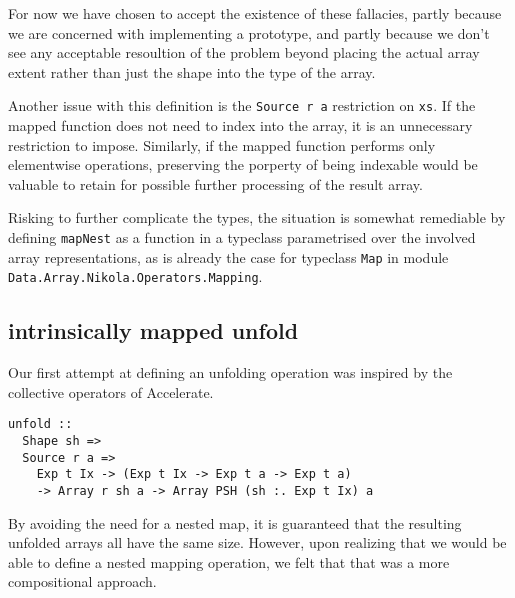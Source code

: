 For now we have chosen to accept the existence of these fallacies, partly
because we are concerned with implementing a prototype, and partly because we
don't see any acceptable resoultion of the problem beyond placing the actual
array extent rather than just the shape into the type of the array.

Another issue with this definition is the \texttt{Source r a} restriction on
\texttt{xs}. If the mapped function does not need to index into the array, it
is an unnecessary restriction to impose.  Similarly, if the mapped function
performs only elementwise operations, preserving the porperty of being
indexable would be valuable to retain for possible further processing of the
result array.

Risking to further complicate the types, the situation is somewhat remediable
by defining \texttt{mapNest} as a function in a typeclass parametrised over the
involved array representations, as is already the case for typeclass
\texttt{Map} in module \texttt{Data.Array.Nikola.Operators.Mapping}.

\subsection{intrinsically mapped unfold}

Our first attempt at defining an unfolding operation was inspired by the
collective operators of Accelerate.

\begin{verbatim}
unfold ::
  Shape sh =>
  Source r a =>
    Exp t Ix -> (Exp t Ix -> Exp t a -> Exp t a)
    -> Array r sh a -> Array PSH (sh :. Exp t Ix) a
\end{verbatim}

By avoiding the need for a nested map, it is guaranteed that the resulting
unfolded arrays all have the same size. However, upon realizing that we would
be able to define a nested mapping operation, we felt that that was a more
compositional approach.
